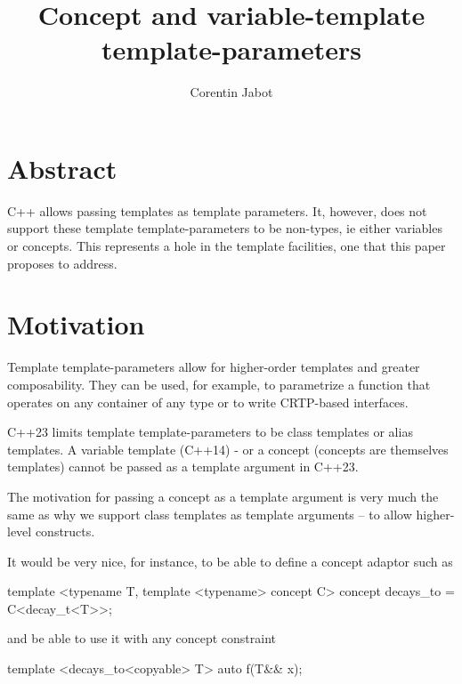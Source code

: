 \documentclass{wg21}
\title{Concept and variable-template template-parameters}
\author{Corentin Jabot}{corentin.jabot@gmail.com}
\begin{document}
\maketitle

\section{Abstract}

C++ allows passing templates as template parameters.
It, however, does not support these template template-parameters to be non-types, ie either variables or concepts.
This represents a hole in the template facilities, one that this paper proposes to address.

\section{Motivation}

Template template-parameters allow for higher-order templates and greater composability.
They can be used, for example, to parametrize a function that operates on any container of any type or to write CRTP-based interfaces.

C++23 limits template template-parameters to be class templates or alias templates.
A variable template (C++14) - or a concept (concepts are themselves templates) cannot be passed as a template argument in C++23.

The motivation for passing a concept as a template argument is very much the same as why we support class templates as template arguments -- to allow higher-level constructs.

It would be very nice, for instance, to be able to define a concept adaptor such as

\begin{colorblock}
template <typename T, template <typename> concept C>
concept decays_to = C<decay_t<T>>;
\end{colorblock}

and be able to use it with any concept constraint

\begin{colorblock}
template <decays_to<copyable> T>
auto f(T&& x);
\end{colorblock}
\end{document}
